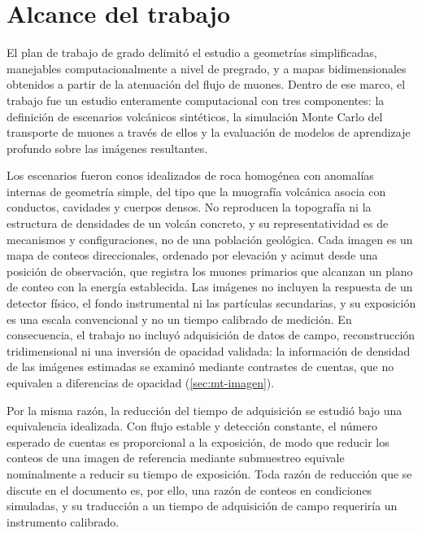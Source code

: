 \section{Alcance del trabajo}
\label{sec:intro-alcance}

El plan de trabajo de grado delimitó el estudio a geometrías simplificadas, manejables computacionalmente a nivel de pregrado, y a mapas bidimensionales obtenidos a partir de la atenuación del flujo de muones. Dentro de ese marco, el trabajo fue un estudio enteramente computacional con tres componentes: la definición de escenarios volcánicos sintéticos, la simulación Monte Carlo del transporte de muones a través de ellos y la evaluación de modelos de aprendizaje profundo sobre las imágenes resultantes.

Los escenarios fueron conos idealizados de roca homogénea con anomalías internas de geometría simple, del tipo que la muografía volcánica asocia con conductos, cavidades y cuerpos densos. No reproducen la topografía ni la estructura de densidades de un volcán concreto, y su representatividad es de mecanismos y configuraciones, no de una población geológica. Cada imagen es un mapa de conteos direccionales, ordenado por elevación y acimut desde una posición de observación, que registra los muones primarios que alcanzan un plano de conteo con la energía establecida. Las imágenes no incluyen la respuesta de un detector físico, el fondo instrumental ni las partículas secundarias, y su exposición es una escala convencional y no un tiempo calibrado de medición. En consecuencia, el trabajo no incluyó adquisición de datos de campo, reconstrucción tridimensional ni una inversión de opacidad validada: la información de densidad de las imágenes estimadas se examinó mediante contrastes de cuentas, que no equivalen a diferencias de opacidad (\cref{sec:mt-imagen}).

Por la misma razón, la reducción del tiempo de adquisición se estudió bajo una equivalencia idealizada. Con flujo estable y detección constante, el número esperado de cuentas es proporcional a la exposición, de modo que reducir los conteos de una imagen de referencia mediante submuestreo equivale nominalmente a reducir su tiempo de exposición. Toda razón de reducción que se discute en el documento es, por ello, una razón de conteos en condiciones simuladas, y su traducción a un tiempo de adquisición de campo requeriría un instrumento calibrado.

